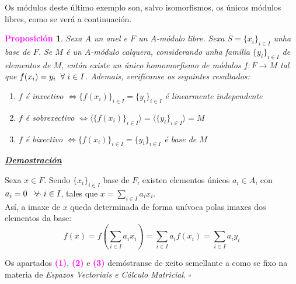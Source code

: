 \documentclass[twoside]{report}
\newcommand{\magbf}[1]{\textcolor{magenta}{\textbf{#1}}} %
\newcommand{\almostall}{\mathrel{\vee\mkern-19mu\frown}} %
\theoremstyle{mystyle}
\newtheorem{prop}{\magbf{Proposición}}[chapter]
\newenvironment{proposition}
{\begin{mdframed}[linecolor = magenta,backgroundcolor = classicrose, linewidth = 2mm]\begin{prop}}
{\end{prop}\end{mdframed}}
\begin{document}
\vspace{3mm}

\noindent Os módulos deste último exemplo son, salvo isomorfismos, os únicos módulos libres, como se verá a continuación.\\

\begin{proposition} \label{prop3.12}
Sexa $A$ un anel e $F$ un $A$-módulo libre. Sexa $S = \{x_{i}\}_{i \in I}$ unha base de $F$. Se $M$ é un $A$-módulo calquera, considerando unha familia $\{y_{i}\}_{i \in I}$ de elementos de $M$, entón existe un único homomorfismo de módulos $f: F \longrightarrow M$ tal que $f(x_{i}) = y_{i} \hspace{2mm} \forall \hspace{1mm} i \in I$. \newline
\newline
\noindent Ademais, verifícanse os seguintes resultados:
\begin{enumerate}
    \item $f$ é inxectivo $\Longleftrightarrow \{f(x_{i})\}_{i \in I} = \{y_{i}\}_{i \in I}$ é linearmente independente
    \item $f$ é sobrexectivo $\Longleftrightarrow \langle \{f(x_{i})\}_{i \in I} \rangle = \langle \{y_{i}\}_{i \in I} \rangle = M$
    \item $f$ é bixectivo $\Longleftrightarrow \{f(x_{i})\}_{i \in I} = \{y_{i}\}_{i \in I}$ é base de $M$
\end{enumerate}
\end{proposition}

\vspace{2mm}

\noindent \textbf{\textit{\underline{Demostración}}}

\vspace{2mm}

\noindent Sexa $x \in F$. Sendo $\{x_{i}\}_{i \in I}$ base de $F$, existen elementos únicos $a_{i} \in A$, con $a_{i} = 0 \hspace{2mm} \almostall i \in I$, tales que $x = \displaystyle \sum_{i \in I} a_{i}x_{i}$.\\

\noindent Así, a imaxe de $x$ queda determinada de forma unívoca polas imaxes dos elementos da base:
$$f(x) = f \left(\displaystyle \sum_{i \in I} a_{i}x_{i}\right) = \displaystyle \sum_{i \in I} a_{i}f(x_{i}) = \displaystyle \sum_{i \in I} a_{i}y_{i}$$

\noindent Os apartados \magbf{(1)}, \magbf{(2)} e \magbf{(3)} demóstranse de xeito semellante a como se fixo na materia de \textit{Espazos Vectoriais e Cálculo Matricial}. $\square$\\
\end{document}
